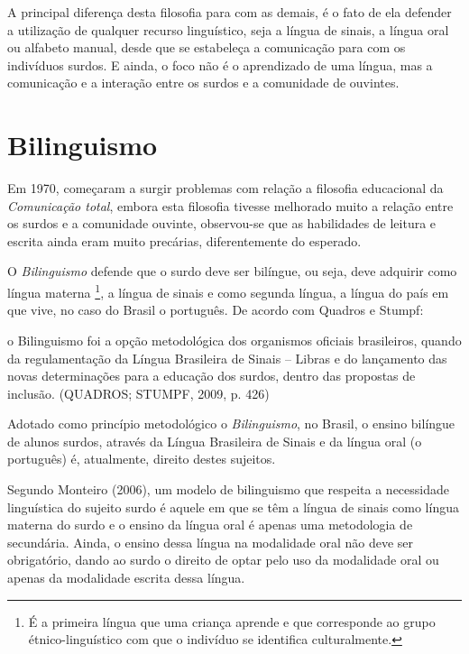 \documentclass[brasil]{abnt}
\begin{document}
		 A principal diferença desta filosofia para com as demais, é o fato de ela defender a utilização de qualquer recurso linguístico, seja a língua de sinais, a língua oral ou alfabeto manual, desde que 
		 se estabeleça a comunicação para com os indivíduos surdos. E ainda, o foco não é o aprendizado de uma língua, mas a comunicação e a interação entre os surdos e a comunidade de ouvintes.
		 
		\section{Bilinguismo}
			Em 1970, começaram a surgir problemas com relação a filosofia educacional da \textit{Comunicação total}, embora esta filosofia tivesse melhorado muito a relação entre os surdos e a comunidade 
			ouvinte, observou-se que as habilidades de leitura e escrita ainda eram muito precárias, diferentemente do esperado. 
			
			O \textit{Bilinguismo} defende que o surdo deve ser bilíngue, ou seja, deve adquirir como língua materna \footnote{É a primeira língua que uma criança aprende e que corresponde ao grupo 
			étnico-linguístico com que o indivíduo se identifica culturalmente.}, a língua de sinais e como segunda língua, a língua do país em 
			que vive, no caso do Brasil o português. De acordo com Quadros e Stumpf:
			
				\begin{citacao}o Bilinguismo foi a opção metodológica dos organismos oficiais brasileiros, quando da regulamentação da Língua Brasileira de Sinais – Libras e do lançamento das novas 
								determinações para a educação dos surdos, dentro das propostas de inclusão. (QUADROS; STUMPF, 2009, p. 426)
				\end{citacao}
			
			Adotado como princípio metodológico o \textit{Bilinguismo}, no Brasil, o ensino bilíngue de alunos surdos, através da Língua Brasileira de Sinais e da língua oral (o português) é,  atualmente, direito destes sujeitos. 
			
			Segundo Monteiro (2006), um modelo de bilinguismo que respeita a necessidade linguística do sujeito surdo é aquele em que se têm a língua de sinais como língua materna do surdo e o ensino da língua 
			oral é apenas uma metodologia de secundária.  Ainda, o ensino dessa língua na modalidade oral não deve ser obrigatório, dando ao surdo o direito de optar pelo uso da modalidade oral ou apenas da modalidade escrita dessa língua.
						
\end{document}
